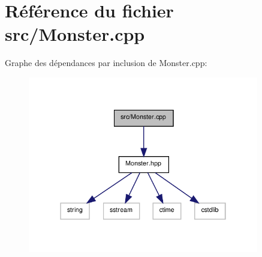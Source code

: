 \section{Référence du fichier src/\-Monster.cpp}
\label{_monster_8cpp}
Graphe des dépendances par inclusion de Monster.\-cpp\-:\nopagebreak
\begin{figure}[H]
\begin{center}
\leavevmode
\includegraphics[width=286pt]{_monster_8cpp__incl}
\end{center}
\end{figure}
